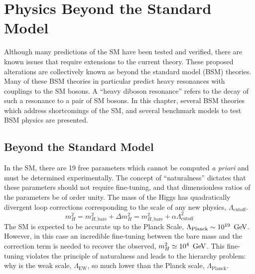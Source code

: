
\chapter{Physics Beyond the Standard Model}
\label{ch:limitations}

Although many predictions of the SM have been tested and verified, there are known issues that require extensions to the current theory. These proposed alterations are collectively known as beyond the standard model (BSM) theories. Many of these BSM theories in particular predict heavy resonances with couplings to the SM bosons. A ``heavy diboson resonance'' refers to the decay of such a resonance to a pair of SM bosons. In this chapter, several BSM theories which address shortcomings of the SM, and several benchmark models to test BSM physics are presented.

\section{Beyond the Standard Model}

In the SM, there are 19 free parameters which cannot be computed {\em a priori} and must be determined experimentally. The concept of ``naturalness'' dictates that these parameters should not require fine-tuning, and that dimensionless ratios of the parameters be of order unity. The mass of the Higgs has quadratically divergent loop corrections corresponding to the scale of any new physics, $\Lambda_{\text{cutoff}}$. 
$$m_H^2=m_{H,\text{bare}}^2+ \Delta m_H^2 = m_{H,\text{bare}}^2 + \alpha \Lambda_{\text{cutoff}}^2$$
The SM is expected to be accurate up to the Planck Scale, $\Lambda_{\text{Planck}}\sim 10^{19}\,\GeV$. However, in this case an incredible fine-tuning between the bare mass and the correction term is needed to recover the observed, $m_H^2\simeq 10^4\,\GeV$.  This fine-tuning violates the principle of naturalness and leads to the hierarchy problem: why is the weak scale, $\Lambda_{\text{EW}}$, so much lower than the Planck scale, $\Lambda_{\text{Planck}}$.


